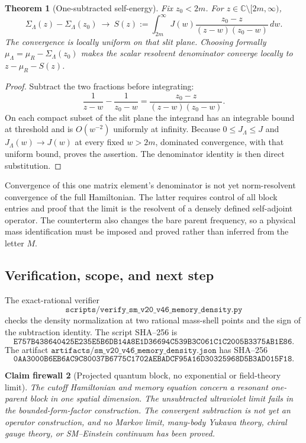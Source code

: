 \documentclass[11pt]{article}
\newtheorem{theorem}{Theorem}[section]
\newtheorem{firewall}[theorem]{Claim firewall}
\theoremstyle{remark}
\begin{document}
\begin{theorem}[One-subtracted self-energy]
\label{thm:v20v46-subtraction}
Fix \(z_0<2m\).  For \(z\in\mathbb C\setminus[2m,\infty)\),
\[
 \Sigma_\Lambda(z)-\Sigma_\Lambda(z_0)\ \longrightarrow\
 S(z):=\int_{2m}^{\infty}J(w)
 \frac{z_0-z}{(z-w)(z_0-w)}\,dw .
\]
The convergence is locally uniform on that slit plane.
Choosing formally
\(\mu_\Lambda=\mu_R-\Sigma_\Lambda(z_0)\) makes the scalar
resolvent denominator converge locally to \(z-\mu_R-S(z)\).
\end{theorem}
\begin{proof}
Subtract the two fractions before integrating:
\[
 \frac1{z-w}-\frac1{z_0-w}
 =\frac{z_0-z}{(z-w)(z_0-w)}.
\]
On each compact subset of the slit plane the integrand has an
integrable bound at threshold and is \(O(w^{-2})\) uniformly at
infinity.  Because \(0\leq J_\Lambda\leq J\) and
\(J_\Lambda(w)\to J(w)\) at every fixed \(w>2m\), dominated
convergence, with that uniform bound, proves the assertion.
The denominator identity is then direct substitution.
\end{proof}

Convergence of this one matrix element's denominator is not yet
norm-resolvent convergence of the full Hamiltonian.  The latter
requires control of all block entries and proof that the limit
is the resolvent of a densely defined self-adjoint operator.
The counterterm also changes the bare parent frequency, so a
physical mass identification must be imposed and proved rather
than inferred from the letter \(M\).

\subsection{Verification, scope, and next step}

The exact-rational verifier
\[
 \texttt{scripts/verify\_sm\_v20\_v46\_memory\_density.py}
\]
checks the density normalization at two rational mass-shell points
and the sign of the subtraction identity.  The script SHA--256 is
\[
\texttt{E757B438640425E235E5B6DB14A8E1D36694C539B3C061C1C2005B3375AB1E86}.
\]
The artifact
\(\texttt{artifacts/sm\_v20\_v46\_memory\_density.json}\)
has SHA--256
\[
\texttt{0AA3000B6EB6AC9C80037B6775C1702AEBADCF95A16D30325968D5B3AD015F18}.
\]

\begin{firewall}[Projected quantum block, no exponential or field-theory limit]
\label{fire:v20v46}
The cutoff Hamiltonian and memory equation concern a resonant
one-parent block in one spatial dimension.  The unsubtracted
ultraviolet limit fails in the bounded-form-factor construction.
The convergent subtraction is not yet an operator construction,
and no Markov limit, many-body Yukawa theory, chiral gauge theory,
or SM--Einstein continuum has been proved.
\end{firewall}
\end{document}
